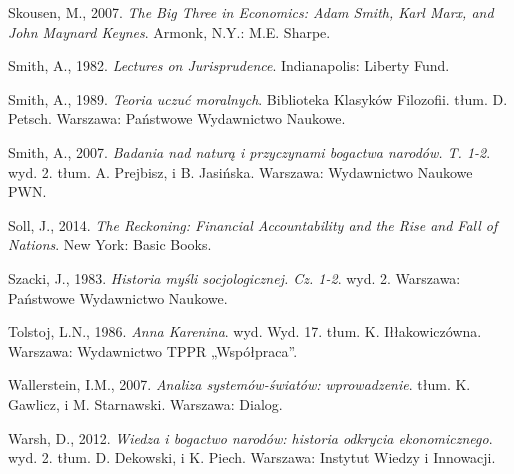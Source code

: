 \documentclass[a4paper]{article}
\begin{document}
Skousen, M., 2007. \textit{The Big Three in Economics: Adam Smith, Karl Marx, and John Maynard Keynes}. Armonk, N.Y.:
M.E. Sharpe.

Smith, A., 1982. \textit{Lectures on Jurisprudence}. Indianapolis: Liberty Fund.

Smith, A., 1989. \textit{Teoria uczuć moralnych}. Biblioteka Klasyków Filozofii. tłum. D. Petsch. Warszawa: Państwowe
Wydawnictwo Naukowe.

Smith, A., 2007. \textit{Badania nad naturą i przyczynami bogactwa narodów. T. 1-2}. wyd. 2. tłum. A. Prejbisz, i B.
Jasińska. Warszawa: Wydawnictwo Naukowe PWN.

Soll, J., 2014. \textit{The Reckoning: Financial Accountability and the Rise and Fall of Nations}. New York: Basic
Books.

Szacki, J., 1983. \textit{Historia myśli socjologicznej. Cz. 1-2}. wyd. 2. Warszawa: Państwowe Wydawnictwo Naukowe.

Tolstoj, L.N., 1986. \textit{Anna Karenina}. wyd. Wyd. 17. tłum. K. Iłłakowiczówna. Warszawa: Wydawnictwo TPPR
„Współpraca”.

Wallerstein, I.M., 2007. \textit{Analiza systemów-światów: wprowadzenie}. tłum. K. Gawlicz, i M. Starnawski. Warszawa:
Dialog.

Warsh, D., 2012. \textit{Wiedza i bogactwo narodów: historia odkrycia ekonomicznego}. wyd. 2. tłum. D. Dekowski, i K.
Piech. Warszawa: Instytut Wiedzy i Innowacji.
\end{document}
